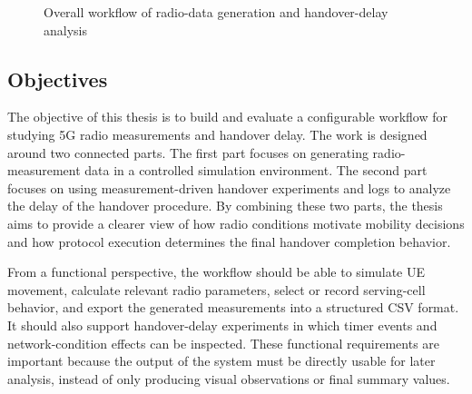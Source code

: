 \begin{figure}[H]
\centering
{}
\caption{Overall workflow of radio-data generation and handover-delay analysis}
\label{fig:introduction-workflow}
\end{figure}

\subsection{Objectives}

The objective of this thesis is to build and evaluate a configurable workflow for studying 5G radio measurements and handover delay. The work is designed around two connected parts. The first part focuses on generating radio-measurement data in a controlled simulation environment. The second part focuses on using measurement-driven handover experiments and logs to analyze the delay of the handover procedure. By combining these two parts, the thesis aims to provide a clearer view of how radio conditions motivate mobility decisions and how protocol execution determines the final handover completion behavior.

From a functional perspective, the workflow should be able to simulate UE movement, calculate relevant radio parameters, select or record serving-cell behavior, and export the generated measurements into a structured CSV format. It should also support handover-delay experiments in which timer events and network-condition effects can be inspected. These functional requirements are important because the output of the system must be directly usable for later analysis, instead of only producing visual observations or final summary values.


